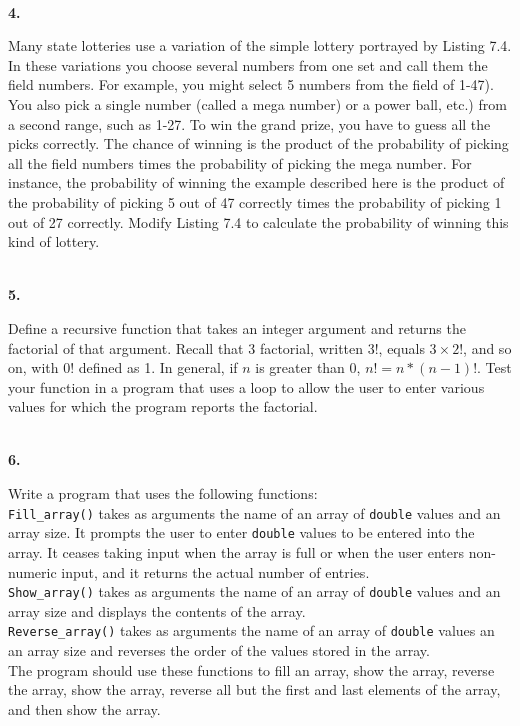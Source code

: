 \documentclass[10 pt]{amsart}
\newlength{\cwidth}
\newenvironment{cpart}[2][\cwidth]
	{\\ \phantom{\qquad}\textbf{#2. }\begin{minipage}[t]{#1}}
	{\end{minipage}}
\newcommand{\ttt}[1]{\texttt{#1}}
\begin{document}
	\begin{cpart}{4}
		Many state lotteries use a variation of the simple lottery
		portrayed by Listing 7.4.
		In these variations you choose several numbers from one set
		and call them the field numbers.
		For example, you might select 5 numbers from the field of 
		1-47).
		You also pick a single number (called a mega number) or a
		power ball, etc.) from a second range, such as 1-27.
		To win the grand prize, you have to guess all the picks 
		correctly. 
		The chance of winning is the product of the probability of
		picking all the field numbers times the probability
		of picking the mega number.
		For instance, the probability of winning the example
		described here is the product of the probability of 
		picking 5 out of 47 correctly times the probability
		of picking 1 out of 27 correctly.
		Modify Listing 7.4 to calculate the probability
		of winning this kind of lottery.
	\end{cpart}
	\vspace{2ex}

	\begin{cpart}{5}
		Define a recursive function that takes an integer argument 
		and returns the factorial of that argument.
		Recall that 3 factorial, written 3!, equals $3 \times 2!$, 
		and so on, with 0! defined as 1. 
		In general, if $n$ is greater than 0, $n! = n*(n - 1)!$. 
		Test your function in a program that uses a loop to allow
		the user to enter various values for which the program
		reports the factorial.
	\end{cpart}
	\vspace{2ex}

	\begin{cpart}{6}
		Write a program that uses the following functions: \\[2ex]
		\ttt{Fill\_array()} takes as arguments the name of an array
		of \ttt{double} values and an array size.
		It prompts the user to enter \ttt{double} values to be
		entered into the array.
		It ceases taking input when the array is full or when
		the user enters non-numeric input, and it returns the 
		actual number of entries. \\[2ex]
		\ttt{Show\_array()} takes as arguments the name of an array of 
		\ttt{double} values and an array size and displays the
		contents of the array. \\[2ex]
		\ttt{Reverse\_array()} takes as arguments the name of an
		array of \ttt{double} values an an array size and reverses
		the order of the values stored in the array. \\[2ex]
		The program should use these functions to fill an array,
		show the array, reverse the array, show the array, 
		reverse all but the first and last elements of the array,
		and then show the array.
	\end{cpart}
	\vspace{2ex}
\end{document}
